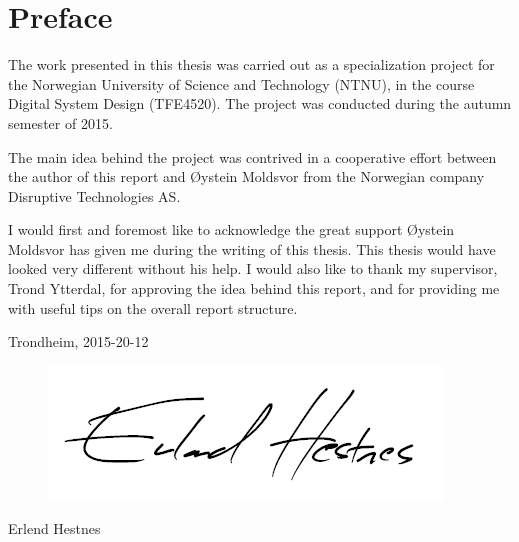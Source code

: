 \section*{Preface}

The work presented in this thesis was carried out as a specialization project for the Norwegian University of Science and Technology (NTNU), in the course Digital System Design (TFE4520). The project was conducted during the autumn semester of 2015.  

The main idea behind the project was contrived in a cooperative effort between the author of this report and Øystein Moldsvor from the Norwegian company Disruptive Technologies AS.

I would first and foremost like to acknowledge the great support Øystein Moldsvor has given me during the writing of this thesis. This thesis would have looked very different without his help. I would also like to thank my supervisor, Trond Ytterdal, for approving the idea behind this report, and for providing me with useful tips on the overall report structure. 

\begin{center}
Trondheim, 2015-20-12\\[1pc]
\begin{figure}[h]
\centering
\includegraphics[scale=0.5]{fig/underskrift.png}
\label{fig:underskrift}
\end{figure}
Erlend Hestnes
\end{center}